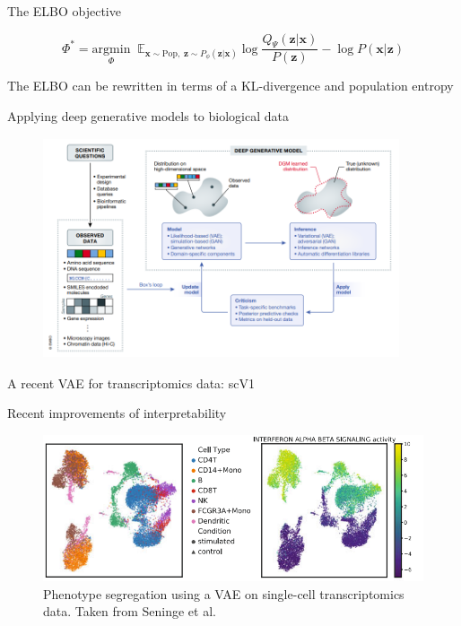 \documentclass{beamer}					%
\begin{document}
\begin{frame}{The ELBO objective}


\begin{equation*}
\Phi^{*} = \underset{\Phi}{\mathrm{argmin}} \;\;\mathbb{E}_{\mathbf{x}\sim \mathrm{Pop},\; \mathbf{z}\sim P_{\phi}(\mathbf{\mathbf{z}|\mathbf{x}})} \log \frac{Q_{\Psi}(\mathbf{z}|\mathbf{x})}{P(\mathbf{z})} - \log P(\mathbf{x}|\mathbf{z})
\end{equation*}

The ELBO can be rewritten in terms of a KL-divergence and population entropy



\end{frame}



\begin{frame}{Applying deep generative models to biological data}
\begin{figure}
\includegraphics[height=65mm, width=105mm]{dbm}
\end{figure}
\end{frame}

\begin{frame}{A recent VAE for transcriptomics data: scV1}

\end{frame}


\begin{frame}{Recent improvements of interpretability}

\begin{figure}
\begin{center}
\includegraphics[width=1.0\textwidth]{immune}
\end{center}
\caption{Phenotype segregation using a VAE on single-cell transcriptomics data. Taken from Seninge et al.}
\end{figure}

\end{frame}
\end{document}

